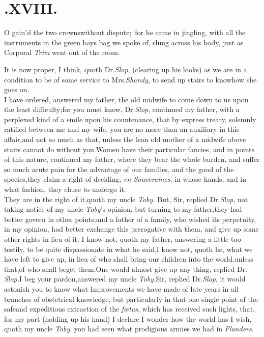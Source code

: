 \documentclass{article}
\begin{document}
\bigskip

\section{.\enspace  XVIII.}

\lettrine{O}{} gain’d the two crowns\break without
dispute;\ for he came in jingling, with all the instruments in
the green bays bag we spoke of, slung across his body, just as
Corporal \textit{Trim} went out of the room.

It is now proper, I think, quoth Dr.\@ \textit{Slop}, (clearing up
his looks) as we are in a condition to be of some service to
Mrs.\@ \textit{Shandy}, to send up stairs to know\break how she goes on.\\
\newpage
I have ordered, answered my father, the old midwife to come down
to us upon the least difficulty;\tsh for you\break
must know, Dr.\@ \textit{Slop}, continued my father, with a perplexed kind of a
smile upon his countenance, that by express treaty, solemnly
ratified between me and my wife, you are no more than an
auxiliary in this affair,\tsk and not so much as that,\tsk
unless the lean old mother of a midwife above stairs cannot do
without you.\tsh Women have their particular fancies, and in
points of this nature, continued my father, where they bear the
whole burden, and suffer so much acute pain for the advantage of
our families, and the good of the species,\tsk they claim a
right of deciding, \textit{en Souveraines}, in whose hands, and
in
what fashion, they chuse to undergo it.\\
\newpage
They are in the right of it,\tsh quoth\break
my uncle \textit{Toby.} But, Sir, replied Dr.\@ \textit{Slop}, not taking notice of
my uncle \textit{Toby}’s opinion, but turning to my
father,\tsk they had better govern in other
points;\tsh and a father of a family, who wished its
perpetuity, in my opinion, had better exchange this prerogative
with them, and give up some other rights in lieu of
it.\tsh\break
I know not, quoth my father, answering a little too testily, to
be quite dispassionate in what he said,\tsk I know not, quoth
he, what we have left to give up, in lieu of who shall bring our
children into the world,\tsk unless that,\tsk of who shall beget
them.\tsh One would almost give up any thing, replied Dr.\@
\textit{Slop.}\tsk I beg your pardon,\tsh answered my uncle
\textit{Toby.}\break\tsk Sir, replied Dr.\@ \textit{Slop}, it
would astonish you to know what Improvements we have made of
late years in all branches
of obstetrical knowledge, but partic\-u\-larly in that
one single point of the safe\break and expeditious extraction of the
\textit{fœtus},\break
\tsh which has received such lights, that, 
for my part (holding up his hand) I 
declare I wonder how the world has\tsh\break
I wish, quoth my uncle \textit{Toby}, you had
seen what prodigious armies we had in \textit{Flanders}.
\end{document}
